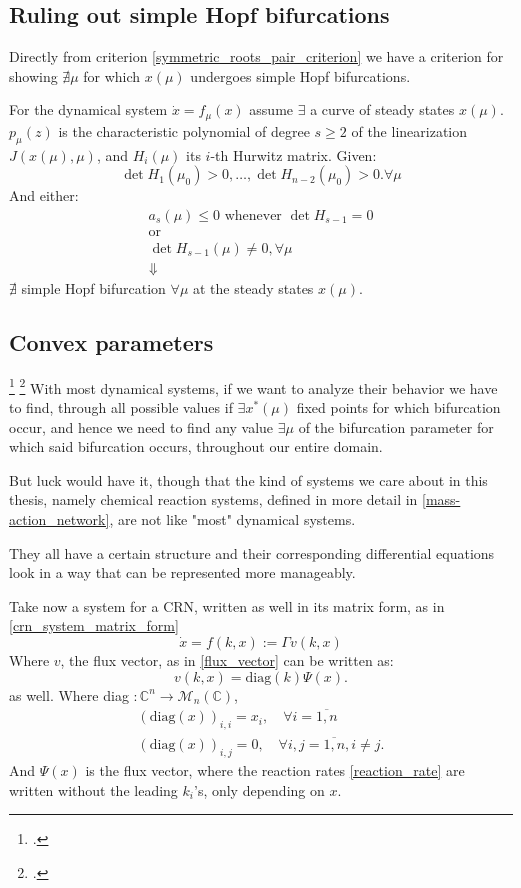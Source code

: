 \subsection{Ruling out simple Hopf bifurcations}

Directly from criterion \ref{symmetric_roots_pair_criterion} we have a criterion for showing $\nexists \mu$ for which $x(\mu)$ undergoes simple Hopf bifurcations.
\begin{theorem}\label{ruling_out_simple_hopf_bif}

	For the dynamical system $\dot{x} = f_\mu(x)$ assume $\exists$ a curve of steady states $x(\mu)$.
	$p_\mu(z)$ is the characteristic polynomial of degree $s \geq 2$ of the linearization $J(x(\mu), \mu)$, and $H_i(\mu)$ its $i$-th Hurwitz matrix. Given:
	\[
		\det H_1(\mu_0) > 0 , \dots, \det H_{n-2} (\mu_0) > 0. \forall \mu
	\]
	And either:
	\begin{gather*}
		a_s(\mu) \leq 0 \text{ whenever  } \det H_{s-1} = 0  \\
		\text{or} \\
		\det   H_{s-1}(\mu) \neq 0, \forall \mu    \\
		\Downarrow
	\end{gather*}
	$\nexists$ simple Hopf bifurcation $\forall \mu$ at the steady states $x(\mu)$.
\end{theorem}

\subsection{Convex parameters}\label{convex_paramteres}
\footcite{ErramiEtAl2015a} \footcite{Rockafellar1973}
With most dynamical systems, if we want to analyze their behavior we have to find, through all possible values if $\exists x^*(\mu)$ fixed points for which bifurcation occur, and hence we need to find any value $\exists \mu$ of the bifurcation parameter for which said bifurcation occurs, throughout our entire domain.

But luck would have it, though that the kind of systems we care about in this thesis, namely chemical reaction systems, defined in more detail in \ref{mass-action_network}, are not like "most" dynamical systems.

They all have a certain structure and their corresponding differential equations look in a way that can be represented more manageably.

Take now a system for a CRN, written as well in its matrix form, as in \ref{crn_system_matrix_form}
\[
	\dot{x} = f(k,x) :=\Gamma v(k,x)
\]
Where $v$, the flux vector, as in \ref{flux_vector} can be written as:
\[
	v(k, x) = \text{diag}(k)\Psi(x).
\]
as well.
Where diag $: \mathbb{C}^n \rightarrow \mathcal{M}_n(\mathbb{C})$,
\begin{align*}
	(\text{diag}(x))_{i,i} = x_i, \quad \forall i = \overline{1,n} \\
	(\text{diag}(x))_{i,j} = 0, \quad \forall i,j = \overline{1,n} , i \neq j.
\end{align*}
And $\Psi(x)$ is the flux vector, where the reaction rates \ref{reaction_rate} are written without the leading $k_i$'s, only depending on $x$.

